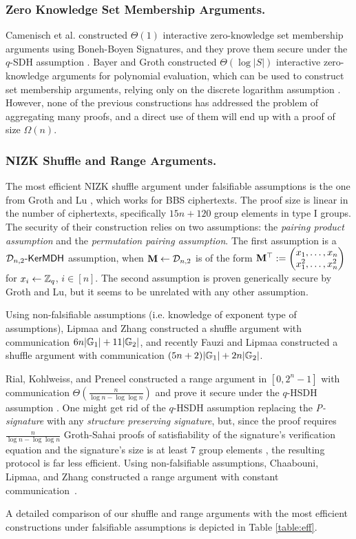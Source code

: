 \subsubsection{Zero Knowledge Set Membership Arguments.}
Camenisch et al. constructed $\Theta(1)$ interactive zero-knowledge set membership arguments using Boneh-Boyen Signatures, and they prove them secure under the $q$-SDH assumption \cite{AC:CamChaShe08}. Bayer and Groth constructed $\Theta(\log |S|)$ interactive zero-knowledge arguments for polynomial evaluation, which can be used to construct set membership arguments, relying only on the discrete logarithm assumption \cite{EC:BayGro13}.
However, none of the previous constructions has addressed the problem of aggregating many proofs, and a direct use of them will end up with a proof of size $\Omega(n)$.

\subsubsection{NIZK Shuffle and Range Arguments.}
The most efficient NIZK shuffle argument under falsifiable assumptions is the one from Groth and Lu \cite{AC:GroLu07}, which works for BBS ciphertexts. The proof size is linear in the number of ciphertexts, specifically $15n + 120$ group elements in type I groups. The security of their construction relies on two assumptions: the \emph{pairing product assumption} and the \emph{permutation pairing assumption}. The first assumption is a $\mathcal{D}_{n,2}\mbox{-}\mathsf{KerMDH}$ assumption, when $\mathbf{{M}}\gets\mathcal{D}_{n,2}$ is of the form $\mathbf{{M}}^\top:=\left(\begin{matrix}x_1,\ldots,x_n\\x_1^2,\ldots,x_n^2\end{matrix}\right)$ for $x_i\gets\mathbb{Z}_q$, $i\in[n]$. The second assumption is proven generically secure by Groth and Lu, but it seems to be unrelated with any other assumption.

Using non-falsifiable assumptions (i.e. knowledge of exponent type of assumptions), Lipmaa and Zhang \cite{SCN:LipZha12} constructed a shuffle argument with communication $6n|\mathbb{G}_1|+11|\mathbb{G}_2|$, and recently Fauzi and Lipmaa  \cite{EPRINT:FauLip15} constructed a shuffle argument with communication $(5n+2)|\mathbb{G}_1|+2n|\mathbb{G}_2|$.

Rial, Kohlweiss, and Preneel constructed a range argument in $[0,2^n-1]$ with communication $\Theta(\frac{n}{\log n -\log\log n})$ and prove it secure under the $q$-HSDH assumption \cite{PAIRING:RiaKohPre09}. One might get rid of the $q$-HSDH assumption replacing the \emph{P-signature} with any \emph{structure preserving signature}, but, since the proof requires $\frac{n}{\log n-\log \log n}$ Groth-Sahai proofs of satisfiability of the signature's verification equation and the signature's size is at least 7 group elements \cite{C:KilPanWee15}, the resulting protocol is far less efficient.
Using non-falsifiable assumptions, Chaabouni, Lipmaa, and Zhang constructed a range argument with constant communication~\cite{FC:ChaLipZha12}. 

A detailed comparison of our shuffle and range arguments with the most efficient constructions under falsifiable assumptions is depicted in Table \ref{table:eff}.



